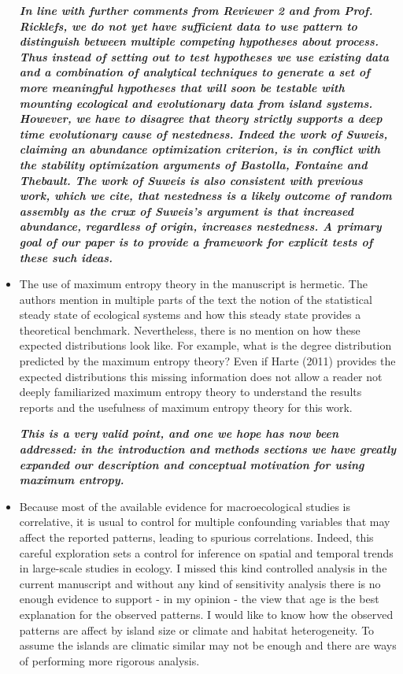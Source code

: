 \documentclass[12pt]{article}
\begin{document}
\begin{itemize}
  \textit{\textbf{In line with further comments from Reviewer 2 and
      from Prof. Ricklefs, we do not yet have sufficient data to use
      pattern to distinguish between multiple competing hypotheses
      about process. Thus instead of setting out to test hypotheses we
      use existing data and a combination of analytical techniques to
      generate a set of more meaningful hypotheses that will soon be
      testable with mounting ecological and evolutionary data from
      island systems. However, we have to disagree that theory
      strictly supports a deep time evolutionary cause of
      nestedness. Indeed the work of Suweis, claiming an abundance
      optimization criterion, is in conflict with the stability
      optimization arguments of Bastolla, Fontaine and Thebault. The
      work of Suweis is also consistent with previous work, which we
      cite, that nestedness is a likely outcome of random assembly as
      the crux of Suweis’s argument is that increased abundance,
      regardless of origin, increases nestedness. A primary goal of
      our paper is to provide a framework for explicit tests of these
      such ideas.}}
%
\item The use of maximum entropy theory in the manuscript is
  hermetic. The authors mention in multiple parts of the text the
  notion of the statistical steady state of ecological systems and how
  this steady state provides a theoretical benchmark. Nevertheless,
  there is no mention on how these expected distributions look
  like. For example, what is the degree distribution predicted by the
  maximum entropy theory? Even if Harte (2011) provides the expected
  distributions this missing information does not allow a reader not
  deeply familiarized maximum entropy theory to understand the results
  reports and the usefulness of maximum entropy theory for this work.

  \textit{\textbf{This is a very valid point, and one we hope has now
      been addressed: in the introduction and methods sections we have
      greatly expanded our description and conceptual motivation for
      using maximum entropy.}}
%
\item Because most of the available evidence for macroecological
  studies is correlative, it is usual to control for multiple
  confounding variables that may affect the reported patterns, leading
  to spurious correlations. Indeed, this careful exploration sets a
  control for inference on spatial and temporal trends in large-scale
  studies in ecology. I missed this kind controlled analysis in the
  current manuscript and without any kind of sensitivity analysis
  there is no enough evidence to support - in my opinion - the view
  that age is the best explanation for the observed patterns. I would
  like to know how the observed patterns are affect by island size or
  climate and habitat heterogeneity. To assume the islands are
  climatic similar may not be enough and there are ways of performing
  more rigorous analysis.


\end{itemize}
\end{document}
